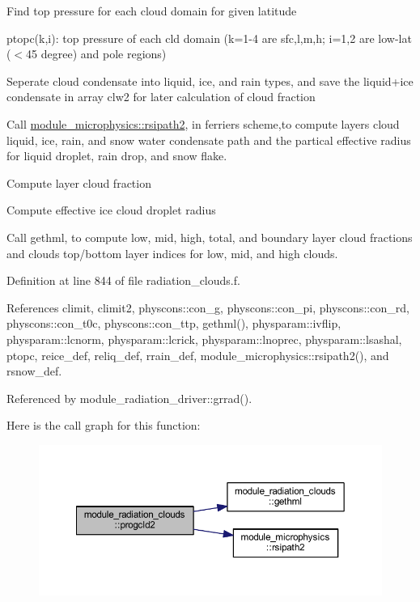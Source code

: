 \begin{DoxyEnumerate}
\item Find top pressure for each cloud domain for given latitude
\begin{DoxyItemize}
\item ptopc(k,i)\+: top pressure of each cld domain (k=1-\/4 are sfc,l,m,h; i=1,2 are low-\/lat ($<$45 degree) and pole regions)
\end{DoxyItemize}
\item Seperate cloud condensate into liquid, ice, and rain types, and save the liquid+ice condensate in array clw2 for later calculation of cloud fraction
\item Call \hyperlink{namespacemodule__microphysics_ac80bc526194e30c9e1a97e7833a2a77f}{module\+\_\+microphysics\+::rsipath2}, in ferrier\textquotesingle{}s scheme,to compute layer\textquotesingle{}s cloud liquid, ice, rain, and snow water condensate path and the partical effective radius for liquid droplet, rain drop, and snow flake.
\item Compute layer cloud fraction
\item Compute effective ice cloud droplet radius
\item Call gethml, to compute low, mid, high, total, and boundary layer cloud fractions and clouds top/bottom layer indices for low, mid, and high clouds. 
\end{DoxyEnumerate}

Definition at line 844 of file radiation\+\_\+clouds.\+f.



References climit, climit2, physcons\+::con\+\_\+g, physcons\+::con\+\_\+pi, physcons\+::con\+\_\+rd, physcons\+::con\+\_\+t0c, physcons\+::con\+\_\+ttp, gethml(), physparam\+::ivflip, physparam\+::lcnorm, physparam\+::lcrick, physparam\+::lnoprec, physparam\+::lsashal, ptopc, reice\+\_\+def, reliq\+\_\+def, rrain\+\_\+def, module\+\_\+microphysics\+::rsipath2(), and rsnow\+\_\+def.



Referenced by module\+\_\+radiation\+\_\+driver\+::grrad().



Here is the call graph for this function\+:\nopagebreak
\begin{figure}[H]
\begin{center}
\leavevmode
\includegraphics[width=350pt]{namespacemodule__radiation__clouds_a2f45f48505bb69a968c788ff680b5642_cgraph}
\end{center}
\end{figure}




